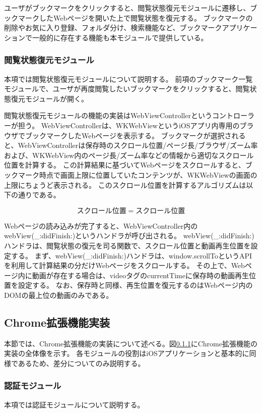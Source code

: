 ユーザがブックマークをクリックすると、閲覧状態復元モジュールに遷移し、ブックマークしたWebページを開いた上で閲覧状態を復元する。
ブックマークの削除やお気に入り登録、フォルダ分け、検索機能など、ブックマークアプリケーションで一般的に存在する機能も本モジュールで提供している。

\subsubsection{閲覧状態復元モジュール}
本項では閲覧状態復元モジュールについて説明する。
前項のブックマーク一覧モジュールで、ユーザが再度閲覧したいブックマークをクリックすると、閲覧状態復元モジュールが開く。

閲覧状態復元モジュールの機能の実装はWebViewControllerというコントローラーが担う。
WebViewControllerは、WKWebViewというiOSアプリ内専用のブラウザでブックマークしたWebページを表示する。
ブックマークが選択されると、WebViewControllerは保存時のスクロール位置/ページ長/ブラウザ/ズーム率および、WKWebView内のページ長/ズーム率などの情報から適切なスクロール位置を計算する。
この計算結果に基づいてWebページをスクロールすると、ブックマーク時点で画面上限に位置していたコンテンツが、WKWebViewの画面の上限にちょうど表示される。
このスクロール位置を計算するアルゴリズムは以下の通りである。

\begin{equation}
スクロール位置 = スクロール位置
\end{equation}

Webページの読み込みが完了すると、WebViewController内のwebView(\_:didFinish:)\cite{didFinish}というハンドラが呼び出される。
webView(\_:didFinish:)ハンドラは、閲覧状態の復元を司る関数で、スクロール位置と動画再生位置を設定する。
まず、webView(\_:didFinish:)ハンドラは、window.scrollToというAPIを利用して計算結果の分だけWebページをスクロールする。
その上で、Webページ内に動画が存在する場合は、videoタグのcurrentTimeに保存時の動画再生位置を設定する。
なお、保存時と同様、再生位置を復元するのはWebページ内のDOMの最上位の動画のみである。


\subsection{Chrome拡張機能実装}
本節では、Chrome拡張機能の実装について述べる。図\ref{}にChrome拡張機能の実装の全体像を示す。
各モジュールの役割はiOSアプリケーションと基本的に同様であるため、差分についてのみ説明する。

\subsubsection{認証モジュール}
本項では認証モジュールについて説明する。

